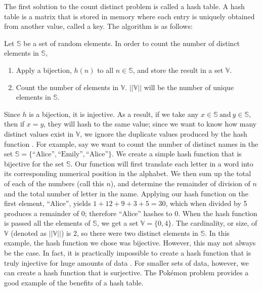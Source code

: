 \documentclass{article}
\begin{document}
\indent The first solution to the count distinct problem is called a hash table. 
A hash table is a matrix that is stored in memory where each entry is uniquely obtained from another value, called a key. 
The algorithm is as follows:
\begin{center}
Let $\mathbb{S}$ be a set of random elements. In order to count the number of distinct elements in $\mathbb{S}$,
\begin{enumerate}
\item Apply a bijection, $h(n)$ to all $n\in\mathbb{S}$, and store the result in a set $\mathbb{V}$.
\item Count the number of elements in $\mathbb{V}$. $||\mathbb{V}||$ will be the number of unique elements in $\mathbb{S}$.
\end{enumerate}
\end{center}
Since $h$ is a bijection, it is injective. 
As a result, if we take any $x\in\mathbb{S}\ \text{and}\ y\in\mathbb{S}$, then if $x = y$, they will hash to the same value; since we want to know how many distinct values exist in $\mathbb{V}$, we ignore the duplicate values produced by the hash function \cite[p. 6]{Maurer}. 
For example, say we want to count the number of distinct names in the set $\mathbb{S} = \{\text{``Alice''},\text{``Emily''},\text{``Alice''}\}$. 
We create a simple hash function that is bijective for the set $\mathbb{S}$.
Our function will first translate each letter in a word into its corresponding numerical position in the alphabet.
We then sum up the total of each of the numbers (call this $n$), and determine the remainder of division of $n$ and the total number of letter in the name.
Applying our hash function on the first element, ``Alice'', yields $1 + 12 + 9 + 3 + 5 = 30$, which when divided by 5 produces a remainder of 0; therefore ``Alice'' hashes to 0.
When the hash function is passed all the elements of $\mathbb{S}$, we get a set $\mathbb{V} = \{0,4\}$. 
The cardinality, or size, of $\mathbb{V}$ (denoted as $||\mathbb{V}||$) is 2, so there were two distinct elements in $\mathbb{S}$. 
In this example, the hash function we chose was bijective.
However, this may not always be the case. In fact, it is practically impossible to create a hash function that is truly injective for huge amounts of data \cite[p. 6]{Maurer}. 
For smaller sets of data, however, we can create a hash function that is surjective. 
The Pok\'emon  problem provides a good example of the benefits of a hash table.\\
\end{document}
